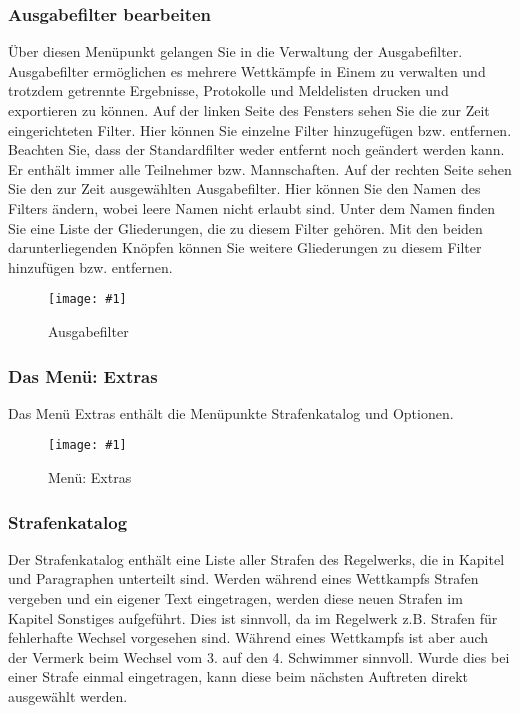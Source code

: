 \documentclass[11pt,a4paper,twoside,ngerman]{article}
\newcommand{\hsmimage}[3]{\begin{figure}[!ht]\centering\texttt{[image: \#1]}\caption{#3}\end{figure}}
\begin{document}
\subsubsection*{Ausgabefilter bearbeiten}
\label{lbl:jauswertungmenus:ausgabefilterbearbeiten}Über diesen Menüpunkt gelangen Sie in die Verwaltung der Ausgabefilter. Ausgabefilter ermöglichen es mehrere Wettkämpfe in Einem zu verwalten und trotzdem getrennte Ergebnisse, Protokolle und Meldelisten drucken und exportieren zu können. Auf der linken Seite des Fensters sehen Sie die zur Zeit eingerichteten Filter. Hier können Sie einzelne Filter hinzugefügen bzw. entfernen. Beachten Sie, dass der Standardfilter weder entfernt noch geändert werden kann. Er enthält immer alle Teilnehmer bzw. Mannschaften. Auf der rechten Seite sehen Sie den zur Zeit ausgewählten Ausgabefilter. Hier können Sie den Namen des Filters ändern, wobei leere Namen nicht erlaubt sind. Unter dem Namen finden Sie eine Liste der Gliederungen, die zu diesem Filter gehören. Mit den beiden darunterliegenden Knöpfen können Sie weitere Gliederungen zu diesem Filter hinzufügen bzw. entfernen.


\hsmimage{pics/ausgabefilter}{.50\textwidth}{Ausgabefilter}

\subsubsection*{Das Menü: Extras}
Das Menü \glqq{}Extras\grqq{} enthält die Menüpunkte Strafenkatalog und Optionen. 


\hsmimage{pics/menu-extras}{.17\textwidth}{Menü: Extras}

\subsubsection*{Strafenkatalog}
Der Strafenkatalog enthält eine Liste aller Strafen des Regelwerks, die in Kapitel und Paragraphen unterteilt sind. Werden während eines Wettkampfs Strafen vergeben und ein eigener Text eingetragen, werden diese \glqq{}neuen\grqq{} Strafen im Kapitel \glqq{}Sonstiges\grqq{} aufgeführt. Dies ist sinnvoll, da im Regelwerk z.B. Strafen für fehlerhafte Wechsel vorgesehen sind. Während eines Wettkampfs ist aber auch der Vermerk \glqq{}beim Wechsel vom 3. auf den 4. Schwimmer\grqq{} sinnvoll. Wurde dies bei einer Strafe einmal eingetragen, kann diese beim nächsten Auftreten direkt ausgewählt werden.
\end{document}
